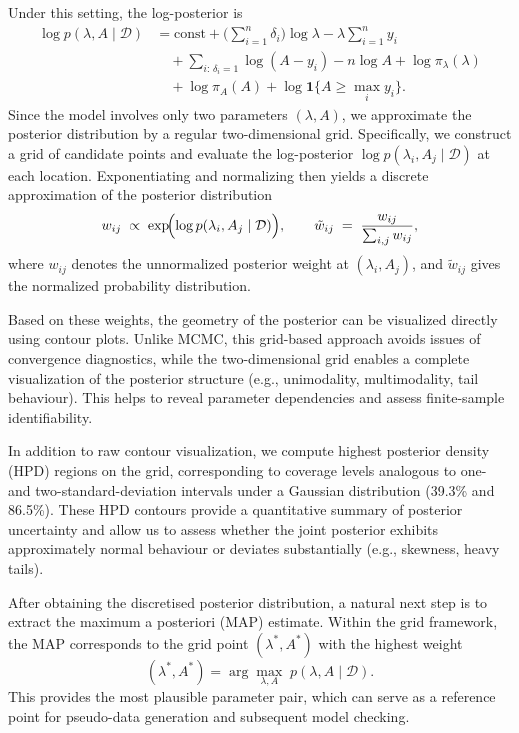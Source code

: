 Under this setting, the log-posterior is
\begin{align}
\log p(\lambda, A \mid \mathcal D)
&= \text{const}
   + \Big(\sum_{i=1}^n \delta_i\Big)\log \lambda
   - \lambda \sum_{i=1}^n y_i \nonumber\\[6pt]
&\quad + \sum_{i:\,\delta_i=1}\log(A-y_i)
   - n \log A
   + \log \pi_\lambda(\lambda) \nonumber \\[6pt]
&\quad + \log \pi_A(A) + \log \mathbf 1\{A \ge \max_i y_i\}.
\end{align}
Since the model involves only two parameters $(\lambda, A)$, we approximate the posterior distribution by a regular two-dimensional grid. Specifically, we construct a grid of candidate points and evaluate the log-posterior $\log p(\lambda_i, A_j \mid \mathcal D)$ at each location. Exponentiating and normalizing then yields a discrete approximation of the posterior distribution
\begin{equation}
    w_{ij} \;\propto\; \exp\!\Bigl(\log p(\lambda_i, A_j \mid \mathcal D)\Bigr), \qquad \tilde w_{ij} \;=\; \frac{w_{ij}}{\sum_{i,j} w_{ij}} ,
\end{equation}
where $w_{ij}$ denotes the unnormalized posterior weight at $(\lambda_i,A_j)$, and $\tilde w_{ij}$ gives the normalized probability distribution.

Based on these weights, the geometry of the posterior can be visualized directly using contour plots. Unlike MCMC, this grid-based approach avoids issues of convergence diagnostics, while the two-dimensional grid enables a complete visualization of the posterior structure (e.g., unimodality, multimodality, tail behaviour). This helps to reveal parameter dependencies and assess finite-sample identifiability.

In addition to raw contour visualization, we compute highest posterior density (HPD) regions on the grid, corresponding to coverage levels analogous to one- and two-standard-deviation intervals under a Gaussian distribution (39.3\% and 86.5\%). These HPD contours provide a quantitative summary of posterior uncertainty and allow us to assess whether the joint posterior exhibits approximately normal behaviour or deviates substantially (e.g., skewness, heavy tails).

After obtaining the discretised posterior distribution, a natural next step is to extract the maximum a posteriori (MAP) estimate. Within the grid framework, the MAP corresponds to the grid point $(\lambda^*, A^*)$ with the highest weight
\begin{equation}
    (\lambda^*, A^*) = \arg\max_{\lambda,A} \; p(\lambda,A \mid \mathcal D).
\end{equation}
This provides the most plausible parameter pair, which can serve as a reference point for pseudo-data generation and subsequent model checking.



